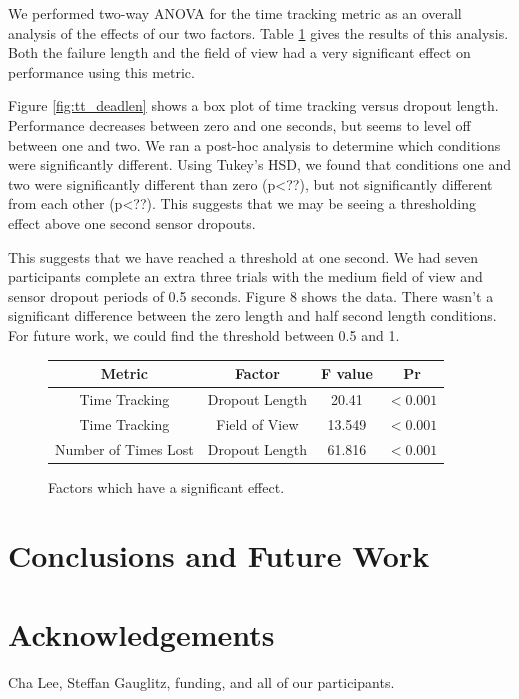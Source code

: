 \documentclass{acmsiggraph}                     %
\begin{document}


We performed two-way {ANOVA} for the time tracking metric as an overall analysis of the effects of our two factors.  Table \ref{fig:anova} gives the results of this analysis.  Both the failure length and the field of view had a very significant effect on performance using this metric.  



Figure \ref{fig:tt_deadlen} shows a box plot of time tracking versus dropout length.  Performance decreases between zero and one seconds, but seems to level off between one and two.  We ran a post-hoc analysis to determine which conditions were significantly different.  Using Tukey's HSD, we found that conditions one and two were significantly different than zero (p<??), but not significantly different from each other (p<??).  This suggests that we may be seeing a thresholding effect above one second sensor dropouts.

This suggests that we have reached a threshold at one second.  We had seven participants complete an extra three trials with the medium field of view and sensor dropout periods of 0.5 seconds.  Figure 8 shows the data.  There wasn't a significant difference between the zero length and half second length conditions.  For future work, we could find the threshold between 0.5 and 1.


\begin{figure}[htb]
\centering
\begin{tabular}{|c|c|c|c|}
\hline
Metric & Factor & F value & Pr \\
\hline
Time Tracking & Dropout Length & 20.41 & $<0.001$\\
Time Tracking & Field of View & 13.549 & $<0.001$\\
Number of Times Lost & Dropout Length & 61.816 & $<0.001$\\
\hline
\end{tabular}
 \caption{\label{fig:anova}Factors which have a significant effect.}
\end{figure}

\section{Conclusions and Future Work}



\section*{Acknowledgements}
Cha Lee, Steffan Gauglitz, funding, and all of our participants.


\nocite{*}

\end{document}
